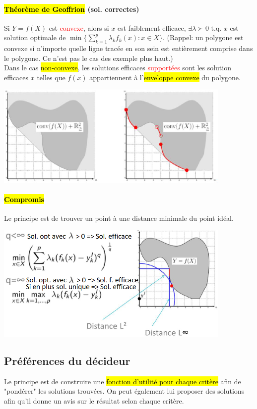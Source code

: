 \documentclass[a4paper, 12pt]{article}
\newcommand{\alinea}{
\hspace*{0.5cm}}
\newcommand{\red}[1]{
	\textcolor{red}{#1}}
\begin{document}
		\paragraph{\hl{Théorème de Geoffrion} (sol. correctes)} Si $Y = f(X)$ est \red{convexe}, alors si $x$ est faiblement efficace, 
			$\exists \lambda \succ 0$ t.q. $x$ est solution optimale de $\min \lbrace \sum\limits^p_{k=1} \lambda_k f_k(x) : 
			x \in X \rbrace$. (Rappel: un polygone est convexe si n'importe quelle ligne tracée en son sein est entièrement comprise
			dans le polygone. Ce n'est pas le cas des exemple plus haut.)\\
			Dans le cas \hl{non-convexe}, les solutions efficaces \red{supportées} sont les solution efficaces $x$ telles que $f(x)$ 	
			appartiennent à l'\hl{enveloppe convexe} du polygone.
		\begin{center}
			\includegraphics[width=4.5in]{Images/convexe}
		\end{center}
		\paragraph{\hl{Compromis}} Le principe est de trouver un point à une distance minimale du point idéal.
			\begin{center}
				\includegraphics[width=4.5in]{Images/distance}
			\end{center}
	\subsection{Préférences du décideur}
		\alinea Le principe est de construire une \hl{fonction d'utilité pour chaque critère} afin de "pondérer" les solutions trouvées.
			On peut également lui proposer des solutions afin qu'il donne un avis sur le résultat selon chaque critère.
\end{document}
